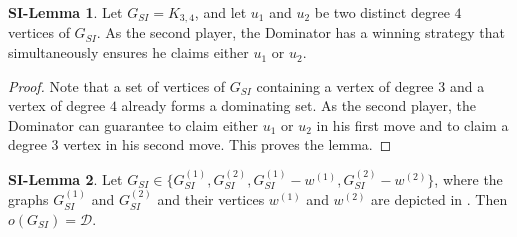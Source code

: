 \documentclass[a4paper,11pt,oneside]{scrartcl}
\theoremstyle{definition}
\newtheorem{si-lemma}{SI-Lemma}
\theoremstyle{remark}
\begin{document}
\begin{si-lemma}\label{si-lemma:K34_special_strat}
    Let $G_{SI}=K_{3,4}$, and let $u_1$ and $u_2$ be two distinct degree $4$ vertices of $G_{SI}$. As the second player, the Dominator has a winning strategy that simultaneously ensures he claims either $u_1$ or $u_2$.
\end{si-lemma}
\begin{proof}
    Note that a set of vertices of $G_{SI}$ containing a vertex of degree $3$ and a vertex of degree $4$ already forms a dominating set. As the second player, the Dominator can guarantee to claim either $u_1$ or $u_2$ in his first move and to claim a degree $3$ vertex in his second move. This proves the lemma.
\end{proof}

\begin{si-lemma}\label{si-lemma:K34_with_extra_vtx}
    Let $G_{SI} \in \{G_{SI}^{(1)}, G_{SI}^{(2)}, G_{SI}^{(1)} - w^{(1)}, G_{SI}^{(2)} - w^{(2)}\}$, where the graphs $G_{SI}^{(1)}$ and $G_{SI}^{(2)}$ and their vertices $w^{(1)}$ and $w^{(2)}$ are depicted in . Then $o(G_{SI}) = \mathcal D$. 
\end{si-lemma}
\end{document}
